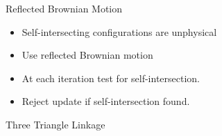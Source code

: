 \documentclass{beamer}
\begin{document}
\begin{frame}{Reflected Brownian Motion}
\begin{itemize}
\item Self-intersecting configurations are unphysical
\item Use reflected Brownian motion
\item At each iteration test for self-intersection.
\item Reject update if self-intersection found.
\end{itemize}
\end{frame}
\begin{frame}{Three Triangle Linkage}
  \centering
\end{frame}

\end{document}
